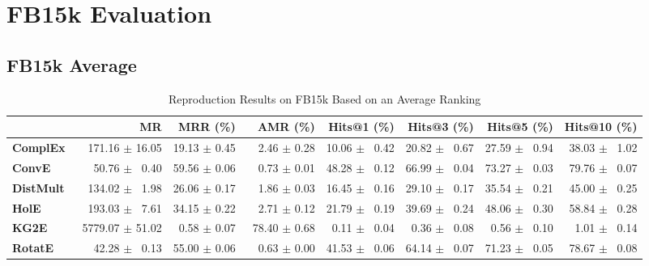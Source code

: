 \documentclass[journal]{IEEEtran}
\begin{document}
\section{FB15k Evaluation}
\subsection{FB15k Average}
\begin{table*}
    \caption{Reproduction Results on FB15k Based on an Average Ranking}
    \label{tab:fb15k_full_results_average_ranking}
    \centering
    \begin{tabular}{lrrrrrrr}
\toprule
{} &                MR &      MRR (\%) &       AMR (\%) &    Hits@1 (\%) &    Hits@3 (\%) &    Hits@5 (\%) &   Hits@10 (\%) \\
\midrule
\textbf{ComplEx } &  $\phantom{5}$$\phantom{5}$171.16 $\pm$ 16.05 &  19.13 $\pm$ 0.45 &  $\phantom{5}$$\phantom{5}$2.46 $\pm$ 0.28 &  10.06 $\pm$ $\phantom{5}$0.42 &  20.82 $\pm$ $\phantom{5}$0.67 &  27.59 $\pm$ $\phantom{5}$0.94 &  38.03 $\pm$ $\phantom{5}$1.02 \\
\textbf{ConvE   } &  $\phantom{5}$$\phantom{5}$$\phantom{5}$50.76 $\pm$ $\phantom{5}$0.40 &  59.56 $\pm$ 0.06 &  $\phantom{5}$$\phantom{5}$0.73 $\pm$ 0.01 &  48.28 $\pm$ $\phantom{5}$0.12 &  66.99 $\pm$ $\phantom{5}$0.04 &  73.27 $\pm$ $\phantom{5}$0.03 &  79.76 $\pm$ $\phantom{5}$0.07 \\
\textbf{DistMult} &  $\phantom{5}$$\phantom{5}$134.02 $\pm$ $\phantom{5}$1.98 &  26.06 $\pm$ 0.17 &  $\phantom{5}$$\phantom{5}$1.86 $\pm$ 0.03 &  16.45 $\pm$ $\phantom{5}$0.16 &  29.10 $\pm$ $\phantom{5}$0.17 &  35.54 $\pm$ $\phantom{5}$0.21 &  45.00 $\pm$ $\phantom{5}$0.25 \\
\textbf{HolE    } &  $\phantom{5}$$\phantom{5}$193.03 $\pm$ $\phantom{5}$7.61 &  34.15 $\pm$ 0.22 &  $\phantom{5}$$\phantom{5}$2.71 $\pm$ 0.12 &  21.79 $\pm$ $\phantom{5}$0.19 &  39.69 $\pm$ $\phantom{5}$0.24 &  48.06 $\pm$ $\phantom{5}$0.30 &  58.84 $\pm$ $\phantom{5}$0.28 \\
\textbf{KG2E    } &  $\phantom{5}$5779.07 $\pm$ 51.02 &  $\phantom{5}$0.58 $\pm$ 0.07 &  $\phantom{5}$78.40 $\pm$ 0.68 &  $\phantom{5}$0.11 $\pm$ $\phantom{5}$0.04 &  $\phantom{5}$0.36 $\pm$ $\phantom{5}$0.08 &  $\phantom{5}$0.56 $\pm$ $\phantom{5}$0.10 &  $\phantom{5}$1.01 $\pm$ $\phantom{5}$0.14 \\
\textbf{RotatE  } &  $\phantom{5}$$\phantom{5}$$\phantom{5}$42.28 $\pm$ $\phantom{5}$0.13 &  55.00 $\pm$ 0.06 &  $\phantom{5}$$\phantom{5}$0.63 $\pm$ 0.00 &  41.53 $\pm$ $\phantom{5}$0.06 &  64.14 $\pm$ $\phantom{5}$0.07 &  71.23 $\pm$ $\phantom{5}$0.05 &  78.67 $\pm$ $\phantom{5}$0.08 \\

\end{tabular}
\end{table*}
\end{document}
